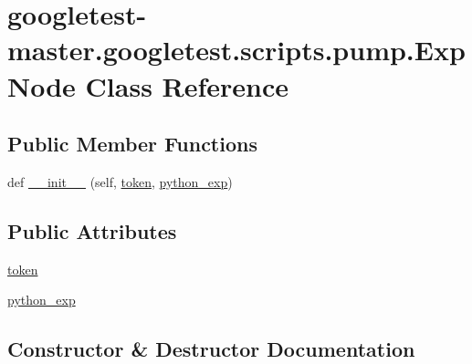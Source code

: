 \hypertarget{classgoogletest-master_1_1googletest_1_1scripts_1_1pump_1_1_exp_node}{}\section{googletest-\/master.googletest.\+scripts.\+pump.\+Exp\+Node Class Reference}
\label{classgoogletest-master_1_1googletest_1_1scripts_1_1pump_1_1_exp_node}
\subsection*{Public Member Functions}
\begin{DoxyCompactItemize}
\item 
def \mbox{\hyperlink{classgoogletest-master_1_1googletest_1_1scripts_1_1pump_1_1_exp_node_a867a0fee8fc95f66d3639bb387652fb7}{\+\_\+\+\_\+init\+\_\+\+\_\+}} (self, \mbox{\hyperlink{classgoogletest-master_1_1googletest_1_1scripts_1_1pump_1_1_exp_node_aff68803d5407cf30c7788bab9d914256}{token}}, \mbox{\hyperlink{classgoogletest-master_1_1googletest_1_1scripts_1_1pump_1_1_exp_node_ab52fb2fffdcd982d59cedaa4fc1b1fb4}{python\+\_\+exp}})
\end{DoxyCompactItemize}
\subsection*{Public Attributes}
\begin{DoxyCompactItemize}
\item 
\mbox{\hyperlink{classgoogletest-master_1_1googletest_1_1scripts_1_1pump_1_1_exp_node_aff68803d5407cf30c7788bab9d914256}{token}}
\item 
\mbox{\hyperlink{classgoogletest-master_1_1googletest_1_1scripts_1_1pump_1_1_exp_node_ab52fb2fffdcd982d59cedaa4fc1b1fb4}{python\+\_\+exp}}
\end{DoxyCompactItemize}


\subsection{Constructor \& Destructor Documentation}
\mbox{\label{classgoogletest-master_1_1googletest_1_1scripts_1_1pump_1_1_exp_node_a867a0fee8fc95f66d3639bb387652fb7}} 
